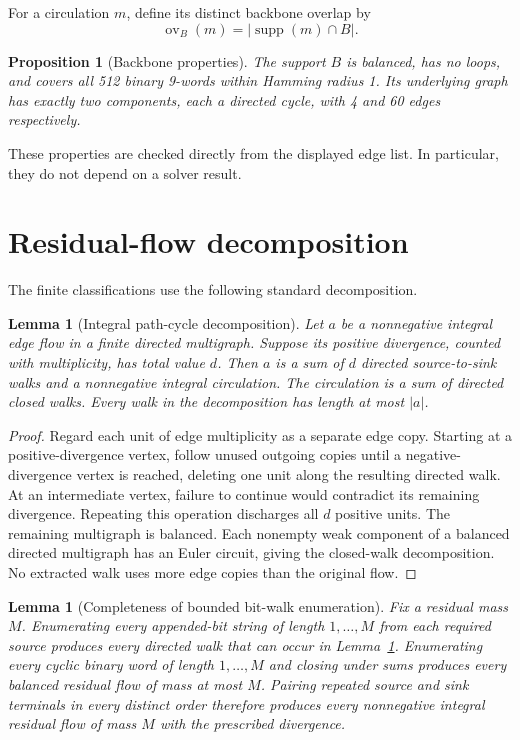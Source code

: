 \documentclass[11pt]{article}
\newtheorem{lemma}[theorem]{Lemma}
\newtheorem{proposition}[theorem]{Proposition}
\theoremstyle{definition}
\theoremstyle{remark}
\newcommand{\supp}{\operatorname{supp}}
\newcommand{\ov}{\operatorname{ov}}
\begin{document}
For a circulation $m$, define its distinct backbone overlap by
\[
  \ov_B(m)=|\supp(m)\cap B|.
\]

\begin{proposition}[Backbone properties]
\label{prop:backbone}
The support $B$ is balanced, has no loops, and covers all 512 binary
9-words within Hamming radius 1.  Its underlying graph has exactly two
components, each a directed cycle, with 4 and 60 edges respectively.
\end{proposition}

These properties are checked directly from the displayed edge list.  In
particular, they do not depend on a solver result.

\section{Residual-flow decomposition}

The finite classifications use the following standard decomposition.

\begin{lemma}[Integral path-cycle decomposition]
\label{lem:decomposition}
Let $a$ be a nonnegative integral edge flow in a finite directed
multigraph.  Suppose its positive divergence, counted with
multiplicity, has total value $d$.  Then $a$ is a sum of $d$ directed
source-to-sink walks and a nonnegative integral circulation.  The
circulation is a sum of directed closed walks.  Every walk in the
decomposition has length at most $|a|$.
\end{lemma}

\begin{proof}
Regard each unit of edge multiplicity as a separate edge copy.  Starting
at a positive-divergence vertex, follow unused outgoing copies until a
negative-divergence vertex is reached, deleting one unit along the
resulting directed walk.  At an intermediate vertex, failure to continue
would contradict its remaining divergence.  Repeating this operation
discharges all $d$ positive units.  The remaining multigraph is balanced.
Each nonempty weak component of a balanced directed multigraph has an
Euler circuit, giving the closed-walk decomposition.  No extracted walk
uses more edge copies than the original flow.
\end{proof}

\begin{lemma}[Completeness of bounded bit-walk enumeration]
\label{lem:enumeration}
Fix a residual mass $M$.  Enumerating every appended-bit string of
length $1,\ldots,M$ from each required source produces every directed
walk that can occur in Lemma~\ref{lem:decomposition}.  Enumerating every
cyclic binary word of length $1,\ldots,M$ and closing under sums produces
every balanced residual flow of mass at most $M$.  Pairing repeated
source and sink terminals in every distinct order therefore produces
every nonnegative integral residual flow of mass $M$ with the prescribed
divergence.
\end{lemma}
\end{document}
